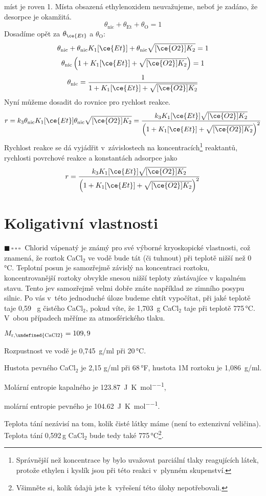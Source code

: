 \documentclass{book}
\let\ch\undefined
\newcommand{\jeden}{$\blacksquare \, \square \, \square \, \square \; \; $}
\renewenvironment{quotation}{\par}{\par} %
\begin{document}
míst je roven 1. Místa obsazená ethylenoxidem neuvažujeme, neboť je
zadáno, že desorpce je okamžitá. 
\[
\theta_{\mathrm{nic}}+\theta_{\mathrm{Et}}+\theta_{\mathrm{O}}=1
\]
Dosadíme opět za $\theta_{\ce{Et}}$ a $\theta_{\mathrm{O}}$: 
\[
\theta_{\mathrm{nic}}+\theta_{\mathrm{nic}}K_{1}[\ce{Et}]+\theta_{\mathrm{nic}}\sqrt{[\ce{O2}]K_{2}}=1
\]
\[
\theta_{\mathrm{nic}}\left(1+K_{1}[\ce{Et}]+\sqrt{[\ce{O2}]K_{2}}\right)=1
\]
\[
\theta_{\mathrm{nic}}=\frac{1}{1+K_{1}[\ce{Et}]+\sqrt{[\ce{O2}]K_{2}}}
\]
Nyní můžeme dosadit do rovnice pro rychlost reakce. 
\[
r=k_{3}\theta_{\mathrm{nic}}K_{1}[\ce{Et}]\theta_{\mathrm{nic}}\sqrt{[\ce{O2}]K_{2}}=\frac{k_{3}K_{1}[\ce{Et}]\sqrt{[\ce{O2}]K_{2}}}{\left(1+K_{1}[\ce{Et}]+\sqrt{[\ce{O2}]K_{2}}\right)^{2}}
\]
Rychlost reakce se dá vyjádřit v~závislostech na koncentracích\footnote{Správnější než koncentrace by bylo uvažovat parciální tlaky reagujících
látek, protože ethylen i kyslík jsou při této reakci v~plynném skupenství.} reaktantů, rychlosti povrchové reakce a konstantách adsorpce jako
\[
r=\frac{k_{3}K_{1}[\ce{Et}]\sqrt{[\ce{O2}]K_{2}}}{\left(1+K_{1}[\ce{Et}]+\sqrt{[\ce{O2}]K_{2}}\right)^{2}}
\]


\section{Koligativní vlastnosti}

\begin{quotation}
\jeden Chlorid vápenatý je známý pro své výborné kryoskopické vlastnosti,
což znamená, že roztok CaCl$_{2}$ ve vodě bude tát (či tuhnout) při teplotě nižší
než 0\,°C. Teplotní posun je samozřejmě závislý na koncentraci roztoku,
koncentrovanější roztoky obvykle snesou nižší teploty zůstávajíce
v kapalném stavu. Tento jev samozřejmě velmi dobře znáte například
ze zimního posypu silnic. Po vás v~této jednoduché úloze budeme chtít
vypočítat, při jaké teplotě taje 0,59~ g čistého CaCl$_{2}$, pokud
víte, že 1,703~g CaCl$_{2}$ taje při teplotě 775\,°C. V~obou případech
měříme za atmosférického tlaku. 

$M_{\mathrm{r,\ch{CaCl2}}}=109,9$ 

Rozpustnost ve vodě je 0,745~g/ml při 20\,°C. 

Hustota pevného CaCl$_{2}$ je 2,15 g/ml při 68\,°F, hustota 1M roztoku
je 1,086~g/ml. 

Molární entropie kapalného \ch{CaCl2} je \SI[inter-unit-product = \ensuremath{{}\cdot{}},output-decimal-marker = {,}]{123,87}{\joule\per\kelvin\per\mole},

molární entropie pevného \ch{CaCl2} je \SI[inter-unit-product = \ensuremath{{}\cdot{}},output-decimal-marker = {,}]{104,62}{\joule\per\kelvin\per\mole}.
\end{quotation} \dotfill \par 
Teplota tání nezávisí na tom, kolik čisté látky máme (není to extenzivní
veličina). Teplota tání 0,592\,g CaCl$_{2}$ bude tedy také 775\,°C\footnote{Všimněte si, kolik údajů jste k~vyřešení této úlohy nepotřebovali.}.
\end{document}
